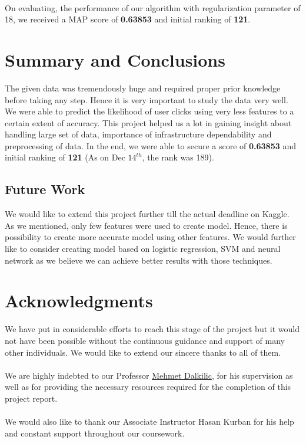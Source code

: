 \documentclass[fleqn,10pt]{SelfArx} %
\begin{document}
 \paragraph{}On evaluating, the performance of our algorithm with regularization parameter of 18, we received a MAP score of \textbf{0.63853} and initial ranking of \textbf{121}.
\section{Summary and Conclusions}
The given data was tremendously huge and required proper prior knowledge before taking any step. 
Hence it is very important to study the data very well. We were able to predict the likelihood of user clicks using very less features to a certain extent of accuracy. This project helped us a lot in gaining insight about handling large set of data, importance of infrastructure dependability and preprocessing of data. In the end, we were able to secure a score of \textbf{0.63853} and initial ranking of \textbf{121} (As on Dec $14^{th}$, the rank was 189). 
\subsection{Future Work}
We would like to extend this project further till the actual deadline on Kaggle. As we mentioned, only few features were used to create model. Hence, there is possibility to create more accurate model using other features. We would further like to consider creating model based on logistic regression, SVM and neural network as we believe we can achieve better results with those techniques.  







\section*{Acknowledgments} %

We have put in considerable efforts to reach this stage of the project but it would not have been possible without the continuous guidance and support of many other individuals. We would like to extend our sincere thanks to all of them.
\\ \\ We are highly indebted to our Professor \href{https://www.soic.indiana.edu/all-people/profile.html?profile_id=187}{Mehmet Dalkilic}, for his supervision as well as for providing the necessary resources required for the completion of this project report.
\\ \\ We would also like to thank our Associate Instructor Hasan Kurban for his help and constant support throughout our coursework.
\end{document}
